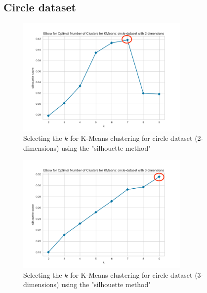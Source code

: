 \subsection{Circle dataset}

\begin{figure}[H]
  \includegraphics[width=0.75\textwidth]{Method/images/k-values/circle-dataset-2-kmeans.png}
  \caption{Selecting the $k$ for K-Means clustering for circle dataset (2-dimensions) using the "silhouette method"}
  \label{hyperparameters:agglomerative-circle-dataset-2d}
\end{figure}
\begin{figure}[H]
  \includegraphics[width=0.75\textwidth]{Method/images/k-values/circle-dataset-3-kmeans.png}
  \caption{Selecting the $k$ for K-Means clustering for circle dataset (3-dimensions) using the "silhouette method"}
  \label{hyperparameters:agglomerative-circle-dataset-3d}
\end{figure}
\newpage

